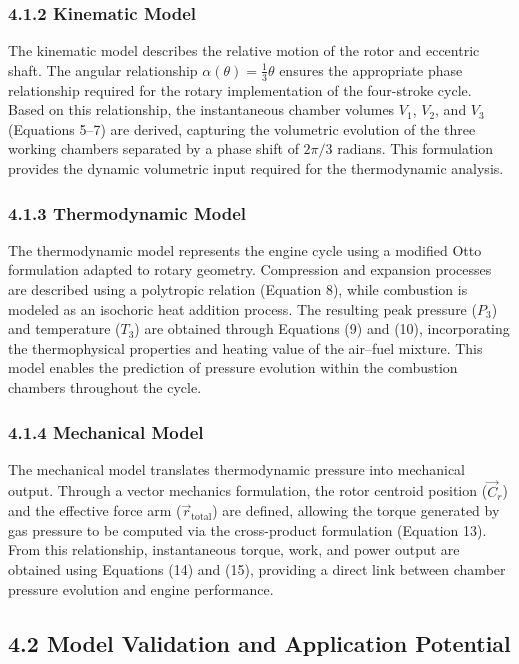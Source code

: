\documentclass[man,floatsintext,noextraspace]{apa6}
\begin{document}
\subsubsection{4.1.2 Kinematic Model}

The kinematic model describes the relative motion of the rotor and eccentric shaft. The angular relationship $\alpha(\theta)=\frac{1}{3}\theta$ ensures the appropriate phase relationship required for the rotary implementation of the four-stroke cycle. Based on this relationship, the instantaneous chamber volumes $V_1$, $V_2$, and $V_3$ (Equations 5–7) are derived, capturing the volumetric evolution of the three working chambers separated by a phase shift of $2\pi/3$ radians. This formulation provides the dynamic volumetric input required for the thermodynamic analysis.

\subsubsection{4.1.3 Thermodynamic Model}

The thermodynamic model represents the engine cycle using a modified Otto formulation adapted to rotary geometry. Compression and expansion processes are described using a polytropic relation (Equation 8), while combustion is modeled as an isochoric heat addition process. The resulting peak pressure ($P_3$) and temperature ($T_3$) are obtained through Equations (9) and (10), incorporating the thermophysical properties and heating value of the air–fuel mixture. This model enables the prediction of pressure evolution within the combustion chambers throughout the cycle.

\subsubsection{4.1.4 Mechanical Model}

The mechanical model translates thermodynamic pressure into mechanical output. Through a vector mechanics formulation, the rotor centroid position ($\vec{C}_r$) and the effective force arm ($\vec{r}_{\text{total}}$) are defined, allowing the torque generated by gas pressure to be computed via the cross-product formulation (Equation 13). From this relationship, instantaneous torque, work, and power output are obtained using Equations (14) and (15), providing a direct link between chamber pressure evolution and engine performance.

\subsection{4.2 Model Validation and Application Potential}
\end{document}

